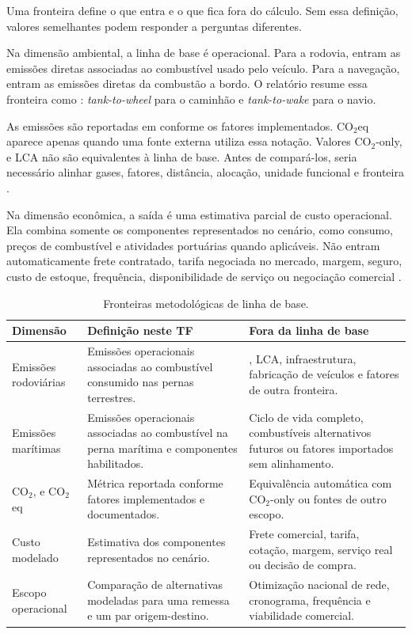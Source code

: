Uma fronteira define o que entra e o que fica fora do cálculo. Sem essa definição, valores semelhantes podem responder a perguntas diferentes.

Na dimensão ambiental, a linha de base é operacional. Para a rodovia, entram as emissões diretas associadas ao combustível usado pelo veículo. Para a navegação, entram as emissões diretas da combustão a bordo. O relatório resume essa fronteira como \ttw{}: \emph{tank-to-wheel} para o caminhão e \emph{tank-to-wake} para o navio.

As emissões são reportadas em \cooe{} conforme os fatores implementados. CO$_2$eq aparece apenas quando uma fonte externa utiliza essa notação. Valores CO$_2$-only, \wtw{} e LCA não são equivalentes à linha de base. Antes de compará-los, seria necessário alinhar gases, fatores, distância, alocação, unidade funcional e fronteira \cite{icct2022,decarb2024,maritimelca2024}.

Na dimensão econômica, a saída é uma estimativa parcial de custo operacional. Ela combina somente os componentes representados no cenário, como consumo, preços de combustível e atividades portuárias quando aplicáveis. Não entram automaticamente frete contratado, tarifa negociada no mercado, margem, seguro, custo de estoque, frequência, disponibilidade de serviço ou negociação comercial \cite{competitiveness2024,modalshiftreview2020}.

\begin{table}[htbp]
\centering
\small
\caption{Fronteiras metodológicas de linha de base.}
\label{tab:fronteiras-metodologicas}
\begin{tabularx}{\textwidth}{L{0.25\textwidth}Y Y}
\toprule
Dimensão & Definição neste TF & Fora da linha de base \\
\midrule
Emissões rodoviárias & Emissões operacionais \ttw{} associadas ao combustível consumido nas pernas terrestres. & \wtw{}, LCA, infraestrutura, fabricação de veículos e fatores de outra fronteira.\\
Emissões marítimas & Emissões operacionais \ttw{} associadas ao combustível na perna marítima e componentes habilitados. & Ciclo de vida completo, combustíveis alternativos futuros ou fatores \wtw{} importados sem alinhamento.\\
CO$_2$, \cooe{} e CO$_2$eq & Métrica reportada conforme fatores implementados e documentados. & Equivalência automática com CO$_2$-only ou fontes de outro escopo.\\
Custo modelado & Estimativa dos componentes representados no cenário. & Frete comercial, tarifa, cotação, margem, serviço real ou decisão de compra.\\
Escopo operacional & Comparação de alternativas modeladas para uma remessa e um par origem-destino. & Otimização nacional de rede, cronograma, frequência e viabilidade comercial.\\
\bottomrule
\end{tabularx}
\end{table}

